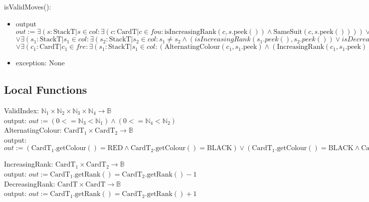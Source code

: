 \documentclass[12pt]{article}
\newcommand{\m}[1]{\mbox{#1}}
\begin{document}
\noindent isValidMoves():
\begin{itemize}
    \item output $out := \exists(s:\m{StackT}|s \in col: \exists(c:\m{CardT}|c \in fou: \m{isIncreasingRank}(c,s.\m{peek}()) \land \m{SameSuit}(c,s.\m{peek}()))) \lor \exists(c_1:\m{CardT}|c_1 \in fre: \exists(c_2:\m{CardT}|c_2 \in fou: \m{isIncreasingRank}(c_2,c_1) \land \m{SameSuit}(c_1,c_2)))$\\
    $\lor \exists(s_1:\m{StackT}|s_1 \in col: \exists(s_2:\m{StackT}|s_2 \in col: s_1 \neq s_2 \land (isIncreasingRank(s_1.peek(),s_2.peek()) \lor isDecreasingRank(s_1.peek(),s_2.peek())) \land iAlternatingRank(S_1.peek(),s_2.peek()) \land \lnot isStackEmpty(s_1) \land \lnot isStackEmpty(s_2) ))$\\
    $\lor \exists(c_1:\m{CardT}|c_1 \in fre: \exists (s_1:\m{StackT}|s_1 \in col: (\m{AlternatingColour}(c_1,s_1.\m{peek}) \land (\m{IncreasingRank}(c_1,s_1.\m{peek}) \lor \m{DecreasingRank}(c_1,s_1.\m{peek})) \land c_1.\m{isValid}()) \lor (\lnot c_1.\m{isValid})\land \lnot \m{isStackEmpty}(s_1) )) $\\
    \item exception: None
\end{itemize}

\subsection*{Local Functions}

\noindent ValidIndex: $\mathbb{N}_1\times\mathbb{N}_2\times\mathbb{N}_3\times\mathbb{N}_4\rightarrow\mathbb{B}$\\
\noindent output: $out := (0<=\mathbb{N}_3<\mathbb{N}_1) \land (0<=\mathbb{N}_4<\mathbb{N}_2)$\\

\noindent AlternatingColour: $\mbox{CardT}_1 \times \mbox{CardT}_2 \rightarrow \mathbb{B}$\\
\noindent output: $out := (\mbox{CardT}_1.\m{getColour}()=\m{RED} \land \mbox{CardT}_2.\m{getColour}()=\m{BLACK}) \lor (\mbox{CardT}_1.\m{getColour}()=\m{BLACK} \land \mbox{CardT}_2.\m{getColour}()=\m{RED})$

\noindent IncreasingRank: $\mbox{CardT}_1 \times \mbox{CardT}_2 \rightarrow \mathbb{B}$\\ %
\noindent output: $out := \mbox{CardT}_1.\m{getRank}()=\mbox{CardT}_2.\m{getRank}()-1$\\

\noindent DecreasingRank: $\mbox{CardT} \times \mbox{CardT} \rightarrow \mathbb{B}$\\ %
\noindent output: $out := \mbox{CardT}_1.\m{getRank}()=\mbox{CardT}_2.\m{getRank}()+1$\\
\end{document}
